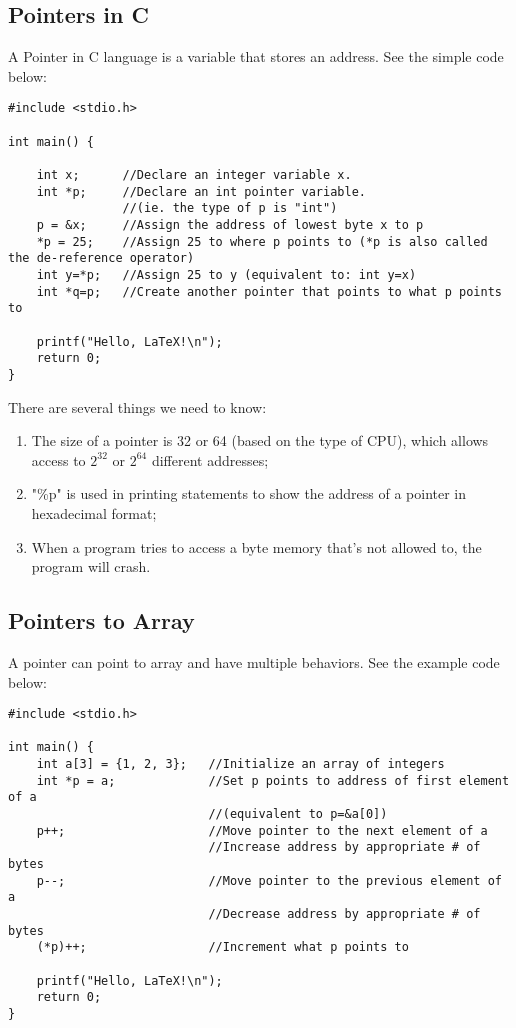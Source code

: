 \documentclass{article}
\begin{document}
\subsection{Pointers in C}
A Pointer in C language is a variable that stores an address. See the simple code below:
\begin{verbatim}
#include <stdio.h>

int main() {

    int x;      //Declare an integer variable x.
    int *p;     //Declare an int pointer variable. 
                //(ie. the type of p is "int")
    p = &x;     //Assign the address of lowest byte x to p
    *p = 25;    //Assign 25 to where p points to (*p is also called the de-reference operator)
    int y=*p;   //Assign 25 to y (equivalent to: int y=x)
    int *q=p;   //Create another pointer that points to what p points to
    
    printf("Hello, LaTeX!\n"); 
    return 0;
}
\end{verbatim}
There are several things we need to know:
\begin{enumerate}
    \item The size of a pointer is 32 or 64 (based on the type of CPU), which allows access to $2^{32}$ or $2^{64}$ different addresses;
    \item "\%p" is used in printing statements to show the address of a pointer in hexadecimal format;
    \item When a program tries to access a byte memory that’s not allowed to, the program will crash.
\end{enumerate}
\subsection{Pointers to Array}
A pointer can point to array and have multiple behaviors. See the example code below:
\begin{verbatim}
#include <stdio.h>

int main() {
    int a[3] = {1, 2, 3};   //Initialize an array of integers
    int *p = a;             //Set p points to address of first element of a 
                            //(equivalent to p=&a[0])
    p++;                    //Move pointer to the next element of a
                            //Increase address by appropriate # of bytes
    p--;                    //Move pointer to the previous element of a
                            //Decrease address by appropriate # of bytes
    (*p)++;                 //Increment what p points to
    
    printf("Hello, LaTeX!\n");
    return 0;
}
\end{verbatim}
\end{document}
